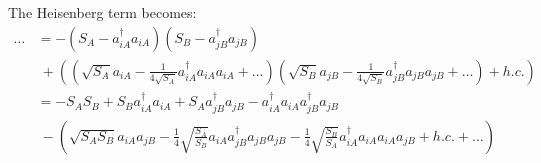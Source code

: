 \documentclass{article}
\begin{document}
The Heisenberg term becomes:
\begin{align}
	\dots &= -(S_A - a_{iA}^\dagger a_{iA}) (S_B - a_{jB}^\dagger a_{jB}) \\
	&\ + \left( \left(\sqrt{S_A} a_{iA} - \frac{1}{4 \sqrt{S_A}} a_{iA}^\dagger a_{iA} a_{iA} + \dots \right) \left(\sqrt{S_B} a_{jB} - \frac{1}{4 \sqrt{S_B}} a_{jB}^\dagger a_{jB} a_{jB} + \dots \right) + h.c. \right) \\
%
	&= -S_A S_B + S_{B} a_{iA}^\dagger a_{iA} + S_{A} a_{jB}^\dagger a_{jB} - a_{iA}^\dagger a_{iA} a_{jB}^\dagger a_{jB} \\
	&\ - \left( \sqrt{S_A S_B} a_{iA} a_{jB} - \frac{1}{4} \sqrt{\frac{S_A}{S_B}} a_{iA} a_{jB}^\dagger a_{jB} a_{jB} - \frac{1}{4} \sqrt{\frac{S_B}{S_A}} a_{iA}^\dagger a_{iA} a_{iA} a_{jB} + h.c. + \dots \right)
\end{align}
\end{document}

